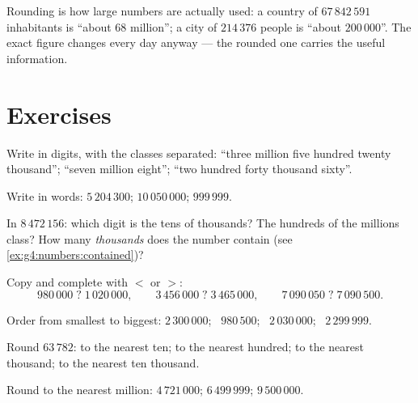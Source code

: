 \begin{example}\label{ex:g4:numbers:world}
Rounding is how large numbers are actually used: a country of
$67\,842\,591$ inhabitants is ``about $68$ million''; a city of
$214\,376$ people is ``about $200\,000$''. The exact figure changes
every day anyway --- the rounded one carries the useful
information.
\end{example}

\section{Exercises}

\begin{exercise}[$\star$]\label{exo:g4:numbers:1}
Write in digits, with the classes separated: ``three million five
hundred twenty thousand''; ``seven million eight''; ``two hundred
forty thousand sixty''.
\end{exercise}

\begin{exercise}[$\star$]\label{exo:g4:numbers:2}
Write in words: $5\,204\,300$; \quad $10\,050\,000$; \quad
$999\,999$.
\end{exercise}

\begin{exercise}[$\star$]\label{exo:g4:numbers:3}
In $8\,472\,156$: which digit is the tens of thousands? The hundreds
of the millions class? How many \emph{thousands} does the number
contain (see \cref{ex:g4:numbers:contained})?
\end{exercise}

\begin{exercise}[$\star$]\label{exo:g4:numbers:4}
Copy and complete with $<$ or $>$:
\[
980\,000 \;?\; 1\,020\,000, \qquad
3\,456\,000 \;?\; 3\,465\,000, \qquad
7\,090\,050 \;?\; 7\,090\,500 .
\]
\end{exercise}

\begin{exercise}[$\star$]\label{exo:g4:numbers:5}
Order from smallest to biggest: $2\,300\,000$; \ $980\,500$; \
$2\,030\,000$; \ $2\,299\,999$.
\end{exercise}

\begin{exercise}[$\star$]\label{exo:g4:numbers:6}
Round $63\,782$: to the nearest ten; to the nearest hundred; to the
nearest thousand; to the nearest ten thousand.
\end{exercise}

\begin{exercise}[$\star$]\label{exo:g4:numbers:7}
Round to the nearest million: $4\,721\,000$; \quad $6\,499\,999$;
\quad $9\,500\,000$.
\end{exercise}

